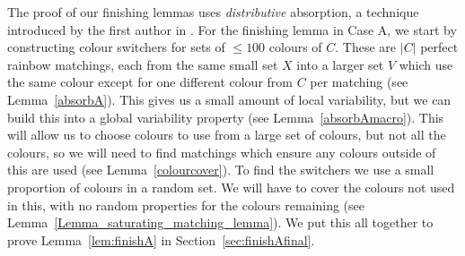 
The proof of our finishing lemmas uses \emph{distributive} absorption, a technique introduced by the first author in \cite{montgomery2018spanning}. For the finishing lemma in Case A, we start by constructing colour switchers for sets of $\leq 100$ colours of $C$. These are $|C|$ perfect rainbow matchings, each from the same small set $X$ into a larger set $V$ which use the same colour except for one different colour from $C$ per matching (see Lemma~\ref{absorbA}). This gives us a small amount of local variability, but we can build this into a global variability property (see Lemma~\ref{absorbAmacro}). This will allow us to choose colours to use from a large set of colours, but not all the colours, so we will need to find matchings which ensure any colours outside of this are used (see Lemma~\ref{colourcover}). To find the switchers we use a small proportion of colours in a random set. We will have to cover the colours not used in this, with no random properties for the colours remaining (see Lemma~\ref{Lemma_saturating_matching_lemma}). We put this all together to prove Lemma~\ref{lem:finishA} in Section~\ref{sec:finishAfinal}.


